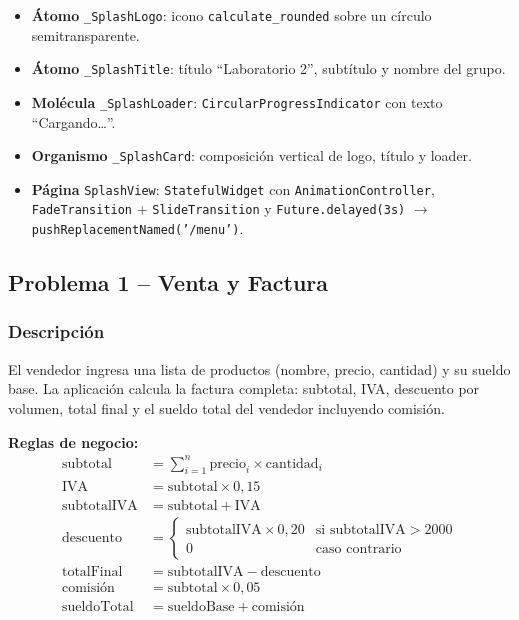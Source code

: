 \documentclass[12pt,a4paper]{article}
\begin{document}
\begin{itemize}
  \item \textbf{Átomo} \texttt{\_SplashLogo}: icono \texttt{calculate\_rounded} sobre un círculo semitransparente.
  \item \textbf{Átomo} \texttt{\_SplashTitle}: título ``Laboratorio 2'', subtítulo y nombre del grupo.
  \item \textbf{Molécula} \texttt{\_SplashLoader}: \texttt{CircularProgressIndicator} con texto ``Cargando\ldots''.
  \item \textbf{Organismo} \texttt{\_SplashCard}: composición vertical de logo, título y loader.
  \item \begin{sloppypar}\textbf{Página} \texttt{SplashView}: \texttt{StatefulWidget} con \texttt{Animation\allowbreak{}Controller}, \texttt{FadeTransition} + \texttt{Slide\allowbreak{}Transition} y \texttt{Future.delayed(3s)} $\rightarrow$ \texttt{push\allowbreak{}ReplacementNamed('/menu')}.\end{sloppypar}
\end{itemize}

\subsection{Problema 1 -- Venta y Factura}

\subsubsection{Descripción}

El vendedor ingresa una lista de productos (nombre, precio, cantidad) y su sueldo base. La aplicación calcula la factura completa: subtotal, IVA, descuento por volumen, total final y el sueldo total del vendedor incluyendo comisión.

\textbf{Reglas de negocio:}
\begin{align}
  \text{subtotal}      &= \sum_{i=1}^{n} \text{precio}_i \times \text{cantidad}_i \\[4pt]
  \text{IVA}           &= \text{subtotal} \times 0{,}15 \\[4pt]
  \text{subtotalIVA}   &= \text{subtotal} + \text{IVA} \\[4pt]
  \text{descuento}     &= \begin{cases} \text{subtotalIVA} \times 0{,}20 & \text{si subtotalIVA} > 2000 \\ 0 & \text{caso contrario} \end{cases} \\[4pt]
  \text{totalFinal}    &= \text{subtotalIVA} - \text{descuento} \\[4pt]
  \text{comisión}      &= \text{subtotal} \times 0{,}05 \\[4pt]
  \text{sueldoTotal}   &= \text{sueldoBase} + \text{comisión}
\end{align}
\end{document}
